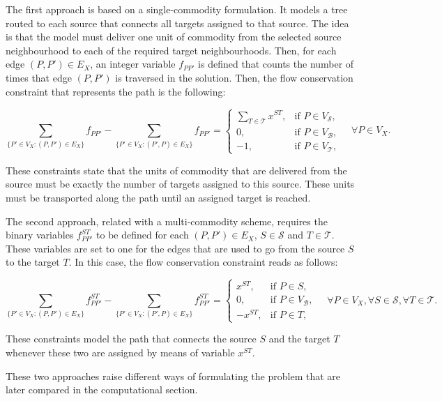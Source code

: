 \documentclass[a4paper,  review, authoryear, 1p.]{elsarticle}
\newcommand{\VB}{{V^{}_{\mathcal B}}}
\newcommand{\VS}{{V^{}_{\mathcal S}}}
\newcommand{\VT}{{V^{}_{\mathcal T}}}
\newcommand{\JP}[1]{{\color{blue}#1}}
\begin{document}
{	The first approach is based on a single-commodity formulation. It models a tree routed to each source that connects all targets assigned to that source. The idea is that the model must deliver one unit of commodity from the selected source neighbourhood to each of the required target neighbourhoods. Then, for each edge $(P, P')\in E_X$, an integer variable $f_{PP'}$ is defined that counts the number of times that edge $(P, P')$ is traversed in the solution. Then, the flow conservation constraint that represents the path is the following:
	
	{\small
	\begin{equation}\label{eq:single-flowC}\tag{single-flow-C}
		\sum_{\{P'\in V_X:(P,P')\in E_X\}}f_{PP'}-\sum_{\{P'\in V_X:(P',P)\in E_X\}}f_{PP'} =\left\{
		\begin{array}{rl} 
			\sum_{T\in\mathcal T} x^{ST}, & \text{if } P\in \VS, \\
			0, & \text{if } P\in \VB, \\
			-1, & \text{if }P\in \VT,
		\end{array}
		\right.\quad\forall P\in V_X.
	\end{equation}}

	These constraints state that the units of commodity that are delivered from the source must be exactly the number of targets assigned to this source. These units must be transported along the path until an assigned target is reached.
	
	The second approach, related with a multi-commodity scheme, \JP{requires the binary variables $f_{PP'}^{ST}$  to be defined for each $(P, P')\in E_X$, $S\in\mathcal S$ and $T\in\mathcal T$. }These variables are set to one for the edges that are used to go from the source $S$ to the target $T$. In this case, the flow conservation constraint reads as follows:
	
	{\small
	\begin{equation}\label{eq:multi-flowC}\tag{multi-flow-C}
		\sum_{\{P'\in V_X:(P,P')\in E_X\}}f_{PP'}^{ST}-\sum_{\{P'\in V_X:(P',P)\in E_X\}}f_{PP'}^{ST} =\left\{
		\begin{array}{rl} 
			x^{ST}, & \text{if } P\in S, \\
			0, & \text{if } P\in \VB, \\
			-x^{ST}, & \text{if }P\in T,
		\end{array}
		\right.\quad\forall P\in V_X,\forall S\in\mathcal S,\forall T\in\mathcal T.
	\end{equation}}

	These constraints model the path that connects the source $S$ and the target $T$ whenever these two are assigned by means of variable $x^{ST}$.
	
	These two approaches raise different ways of formulating the problem that are later compared in the computational section.
	
	
	\newcommand{\xvar}[2]{x(#1#2)}
	
}
	
\end{document}
